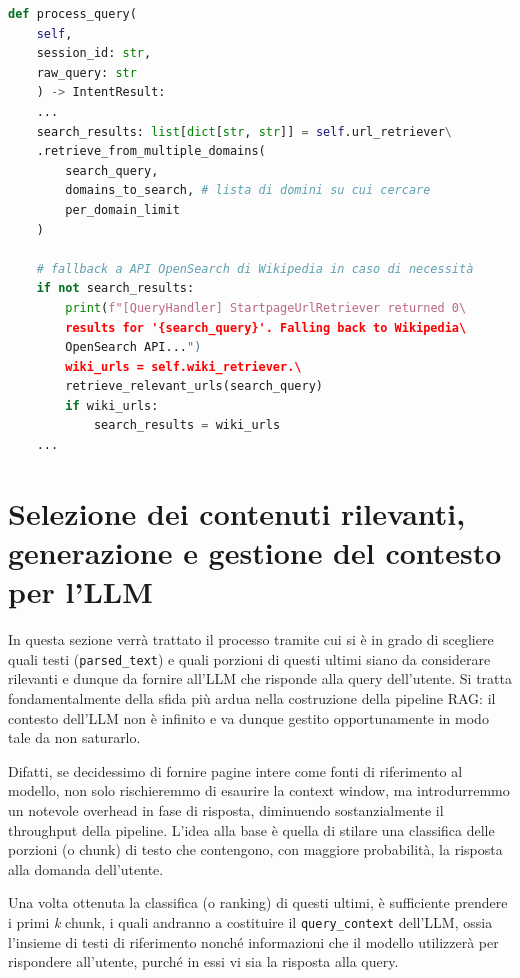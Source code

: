 \begin{lstlisting}[language=Python, caption={Logica di fallback mediante API OpenSearch di Wikipedia.}, label={lst:fallback_wiki_opensearch_api}]
def process_query(
    self, 
    session_id: str, 
    raw_query: str
    ) -> IntentResult:
    ...
    search_results: list[dict[str, str]] = self.url_retriever\
    .retrieve_from_multiple_domains(
        search_query, 
        domains_to_search, # lista di domini su cui cercare 
        per_domain_limit
    )

    # fallback a API OpenSearch di Wikipedia in caso di necessità
    if not search_results:
        print(f"[QueryHandler] StartpageUrlRetriever returned 0\ 
        results for '{search_query}'. Falling back to Wikipedia\
        OpenSearch API...")
        wiki_urls = self.wiki_retriever.\
        retrieve_relevant_urls(search_query)
        if wiki_urls:
            search_results = wiki_urls
    ...

\end{lstlisting}

\section{Selezione dei contenuti rilevanti, generazione e gestione del contesto per l'LLM}
In questa sezione verrà trattato il processo tramite cui si è in grado di scegliere quali testi (\texttt{parsed\_text}) e quali porzioni di questi ultimi siano da considerare rilevanti e dunque da fornire all'LLM che risponde alla query dell'utente. Si tratta fondamentalmente della sfida più ardua nella costruzione della pipeline RAG: il contesto dell'LLM non è infinito e va dunque gestito opportunamente in modo tale da non saturarlo.

Difatti, se decidessimo di fornire pagine intere come fonti di riferimento al modello, non solo rischieremmo di esaurire la context window, ma introdurremmo un notevole overhead in fase di risposta, diminuendo sostanzialmente il throughput della pipeline. L'idea alla base è quella di stilare una classifica delle porzioni (o chunk) di testo che contengono, con maggiore probabilità, la risposta alla domanda dell'utente.

Una volta ottenuta la classifica (o ranking) di questi ultimi, è sufficiente prendere i primi \textit{k} chunk, i quali andranno a costituire il \texttt{query\_context} dell'LLM, ossia l'insieme di testi di riferimento nonché informazioni che il modello utilizzerà per rispondere all'utente, purché in essi vi sia la risposta alla query.

